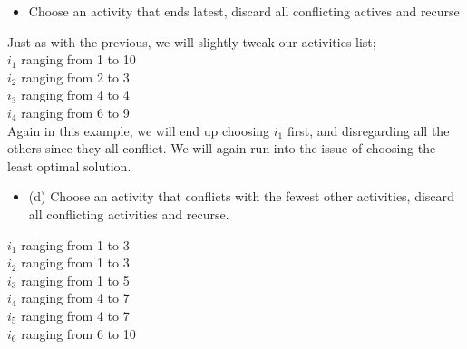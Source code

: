 \documentclass{article}
\begin{document}
\begin{enumerate}
\begin{itemize}
    \item Choose an activity that ends latest, discard all conflicting actives and recurse
\end{itemize}
Just as with the previous, we will slightly tweak our activities list; \\
\newline 
$i_1$ ranging from 1 to 10 \\
$i_2$ ranging from 2 to 3 \\
$i_3$ ranging from 4 to 4 \\
$i_4$ ranging from 6 to 9 \\
\newline 
Again in this example, we will end up choosing $i_1$ first, and disregarding all the others since they all conflict. We will again run into the issue of choosing the least optimal solution. \\
\newline 





\begin{itemize}
    \item (d) Choose an activity that conflicts with the fewest other activities, discard all conflicting activities and recurse.
\end{itemize}
$i_1$ ranging from 1 to 3 \\
$i_2$ ranging from 1 to 3 \\
$i_3$ ranging from 1 to 5 \\
$i_4$ ranging from 4 to 7 \\
$i_5$ ranging from 4 to 7 \\
$i_6$ ranging from 6 to 10 \\


\end{enumerate}
\end{document}
